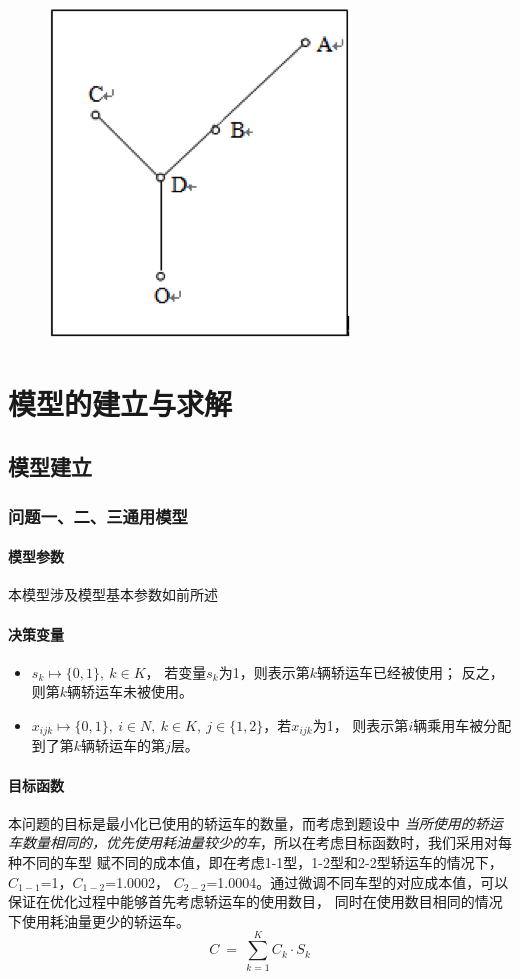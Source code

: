 \documentclass[UTF8]{ctexart}
\begin{document}
\begin{figure}[h!]
	\centering
	\includegraphics[width=0.4\linewidth]{figure/Q4.png}
\end{figure}


\section{模型的建立与求解}
\subsection{模型建立}
\subsubsection{问题一、二、三通用模型}

\paragraph{模型参数}
	本模型涉及模型基本参数如前所述
\paragraph{决策变量}
\begin{itemize}
	\item $s_k \mapsto \{0,1\}, ~ k \in K$， 若变量$s_k$为1，则表示第$k$辆轿运车已经被使用；
	反之，则第$k$辆轿运车未被使用。
	\item $x_{ijk}\mapsto \{0,1\}, ~ i\in N,~ k \in K,~ j\in \{1,2\}$，若$x_{ijk}$为1，
	则表示第$i$辆乘用车被分配到了第$k$辆轿运车的第$j$层。
\end{itemize}

\paragraph{目标函数}
	本问题的目标是最小化已使用的轿运车的数量，而考虑到题设中
	\textit{当所使用的轿运车数量相同的，优先使用耗油量较少的车}，所以在考虑目标函数时，我们采用对每种不同的车型
	赋不同的成本值，即在考虑1-1型，1-2型和2-2型轿运车的情况下，$C_{1-1}$=1，$C_{1-2}$=1.0002，
	$C_{2-2}$=1.0004。通过微调不同车型的对应成本值，可以保证在优化过程中能够首先考虑轿运车的使用数目，
	同时在使用数目相同的情况下使用耗油量更少的轿运车。
	\begin{equation}
		C \ = \ \sum_{k=1}^{K}C_k \cdot S_k
	\end{equation}
\end{document}
